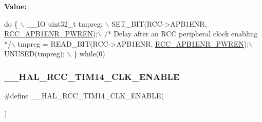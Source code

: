 {\bfseries Value\+:}
\begin{DoxyCode}
\textcolor{keywordflow}{do} \{ \(\backslash\)
                                        \_\_IO uint32\_t tmpreg; \(\backslash\)
                                        SET\_BIT(RCC->APB1ENR, \hyperlink{group___peripheral___registers___bits___definition_ga5c19997ccd28464b80a7c3325da0ca60}{RCC\_APB1ENR\_PWREN});\(\backslash\)
                                        \textcolor{comment}{/* Delay after an RCC peripheral clock enabling */}\(\backslash\)
                                        tmpreg = READ\_BIT(RCC->APB1ENR, 
      \hyperlink{group___peripheral___registers___bits___definition_ga5c19997ccd28464b80a7c3325da0ca60}{RCC\_APB1ENR\_PWREN});\(\backslash\)
                                        UNUSED(tmpreg); \(\backslash\)
                                      \} \textcolor{keywordflow}{while}(0)
\end{DoxyCode}
\mbox{\label{group___r_c_c___a_p_b1___clock___enable___disable_ga28c0bd63fbc7500f9c209ef42c0931b6}} 
\subsubsection{\texorpdfstring{\+\_\+\+\_\+\+H\+A\+L\+\_\+\+R\+C\+C\+\_\+\+T\+I\+M14\+\_\+\+C\+L\+K\+\_\+\+E\+N\+A\+B\+LE}{\_\_HAL\_RCC\_TIM14\_CLK\_ENABLE}}
{\footnotesize\ttfamily \#define \+\_\+\+\_\+\+H\+A\+L\+\_\+\+R\+C\+C\+\_\+\+T\+I\+M14\+\_\+\+C\+L\+K\+\_\+\+E\+N\+A\+B\+LE(\begin{DoxyParamCaption}{ }\end{DoxyParamCaption})}

